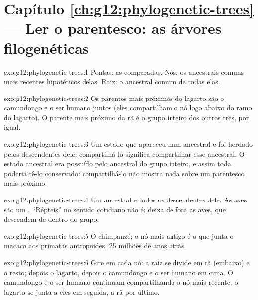 \section*{Capítulo \ref{ch:g12:phylogenetic-trees} --- Ler o parentesco: as árvores filogenéticas}

\begin{solution}{exo:g12:phylogenetic-trees:1}
Pontas: as  comparadas. Nós: os ancestrais comuns mais recentes
hipotéticos delas. Raiz: o ancestral comum de todas elas.
\end{solution}

\begin{solution}{exo:g12:phylogenetic-trees:2}
Os parentes mais próximos do lagarto são o camundongo e o ser humano
juntos (eles compartilham o nó logo abaixo do ramo do lagarto). O
parente mais próximo da rã é o grupo inteiro dos outros três, por igual.
\end{solution}

\begin{solution}{exo:g12:phylogenetic-trees:3}
Um estado que apareceu num ancestral e foi herdado pelos descendentes
dele; compartilhá-lo significa compartilhar esse ancestral. O estado
ancestral era possuído pelo ancestral do grupo inteiro, e assim toda
 poderia tê-lo conservado: compartilhá-lo não mostra nada sobre
um parentesco mais próximo.
\end{solution}

\begin{solution}{exo:g12:phylogenetic-trees:4}
Um ancestral e todos os descendentes dele. As aves são um .
``Répteis'' no sentido cotidiano não é: deixa de fora as aves, que
descendem de dentro do grupo.
\end{solution}

\begin{solution}{exo:g12:phylogenetic-trees:5}
O chimpanzé; o nó mais antigo é o que junta o macaco aos primatas
antropoides, 25 milhões de anos atrás.
\end{solution}

\begin{solution}{exo:g12:phylogenetic-trees:6}
Gire em cada nó: a raiz se divide em rã (embaixo) e o resto; depois o
lagarto, depois o camundongo e o ser humano em cima. O camundongo e o
ser humano continuam compartilhando o nó mais recente, o lagarto se
junta a eles em seguida, a rã por último.
\end{solution}

